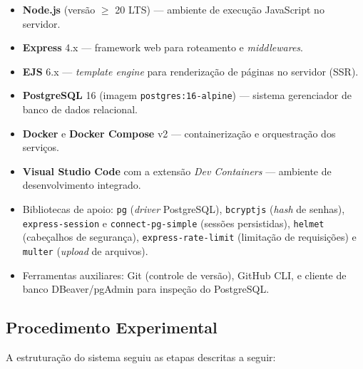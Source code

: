 \documentclass[a4paper,12pt]{article}
\begin{document}
\begin{itemize}[leftmargin=2em]
    \item \textbf{Node.js} (versão $\geq$ 20 LTS) --- ambiente de execução JavaScript
    no servidor.
    \item \textbf{Express} 4.x --- framework web para roteamento e \emph{middlewares}.
    \item \textbf{EJS} 6.x --- \emph{template engine} para renderização de páginas no
    servidor (SSR).
    \item \textbf{PostgreSQL} 16 (imagem \texttt{postgres:16-alpine}) --- sistema
    gerenciador de banco de dados relacional.
    \item \textbf{Docker} e \textbf{Docker Compose} v2 --- containerização e
    orquestração dos serviços.
    \item \textbf{Visual Studio Code} com a extensão \emph{Dev Containers} --- ambiente
    de desenvolvimento integrado.
    \item Bibliotecas de apoio: \texttt{pg} (\emph{driver} PostgreSQL),
    \texttt{bcryptjs} (\emph{hash} de senhas), \texttt{express-session} e
    \texttt{connect-pg-simple} (sessões persistidas), \texttt{helmet} (cabeçalhos de
    segurança), \texttt{express-rate-limit} (limitação de requisições) e
    \texttt{multer} (\emph{upload} de arquivos).
    \item Ferramentas auxiliares: Git (controle de versão), GitHub CLI, e cliente de
    banco DBeaver/pgAdmin para inspeção do PostgreSQL.
\end{itemize}

\subsection{Procedimento Experimental}

A estruturação do sistema seguiu as etapas descritas a seguir:
\end{document}
